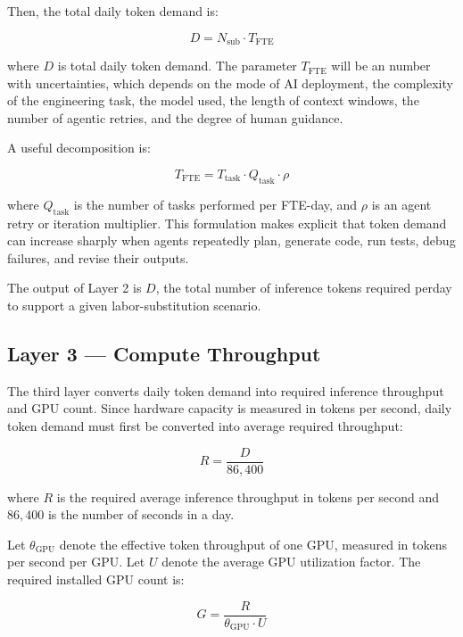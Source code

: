\documentclass{article}
\begin{document}
Then, the total daily token demand is:

\begin{equation}
D = N_{\mathrm{sub}} \cdot T_{\mathrm{FTE}} 
\label{eq2}
\end{equation}

where $D$ is total daily token demand. The parameter $T_{\mathrm{FTE}}$ will be an number with uncertainties, which depends on the mode of AI deployment, the complexity of the engineering task, the model used, the length of context windows, the number of agentic retries, and the degree of human guidance.

A useful decomposition is:

\begin{equation}
T_{\mathrm{FTE}} = T_{\mathrm{task}} \cdot Q_{\mathrm{task}} \cdot \rho 
\label{eq3}
\end{equation}

where $Q_{\mathrm{task}}$ is the number of tasks performed per FTE-day, and $\rho$ is an agent retry or iteration multiplier. This formulation makes explicit that token demand can increase sharply when agents repeatedly plan, generate code, run tests, debug failures, and revise their outputs.

The output of Layer 2 is $D$, the total number of inference tokens required perday to support a given labor-substitution scenario.

\subsection{Layer 3 --- Compute Throughput}

The third layer converts daily token demand into required inference throughput and GPU count. Since hardware capacity is measured in tokens per second, daily token demand must first be converted into average required throughput:

\begin{equation}
R = \frac{D}{86{,}400}
\label{eq4}
\end{equation}

where $R$ is the required average inference throughput in tokens per second and $86{,}400$ is the number of seconds in a day.

Let $\theta_{\mathrm{GPU}}$ denote the effective token throughput of one GPU, measured in tokens per second per GPU. Let $U$ denote the average GPU utilization factor. The required installed GPU count is:

\begin{equation}
G = \frac{R}{\theta_{\mathrm{GPU}} \cdot U}
\label{eq5}
\end{equation}
\end{document}
